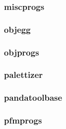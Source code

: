 \documentclass[a4paper]{article}
\begin{document}
\hypertarget{RefHeading23151167907073}{}\subsubsection{}
\clearpage\subsubsection[miscprogs]{miscprogs}
\hypertarget{RefHeading23171167907073}{}\subsubsection{}
\clearpage\subsubsection[objegg]{objegg}
\hypertarget{RefHeading23191167907073}{}\subsubsection{}
\clearpage\subsubsection[objprogs]{objprogs}
\hypertarget{RefHeading23211167907073}{}\subsubsection{}
\clearpage\subsubsection[palettizer]{palettizer}
\hypertarget{RefHeading23231167907073}{}\subsubsection{}
\clearpage\subsubsection[pandatoolbase]{pandatoolbase}
\hypertarget{RefHeading23251167907073}{}\subsubsection{}
\clearpage\subsubsection[pfmprogs]{pfmprogs}
\hypertarget{RefHeading23271167907073}{}\subsubsection{}
\end{document}
